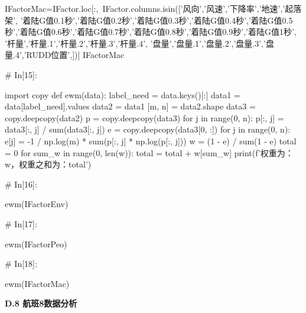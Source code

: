 \documentclass{MathorCupModeling}
\begin{document}
\begin{python}
IFactorMac=IFactor.loc[:,~IFactor.columns.isin(['风向','风速','下降率','地速','起落架',
                          '着陆G值0.1秒','着陆G值0.2秒','着陆G值0.3秒','着陆G值0.4秒','着陆G值0.5秒','着陆G值0.6秒','着陆G值0.7秒','着陆G值0.8秒','着陆G值0.9秒','着陆G值1秒',
                          '杆量','杆量.1','杆量.2','杆量.3','杆量.4',
                          '盘量','盘量.1','盘量.2','盘量.3','盘量.4','RUDD位置',])]
IFactorMac


# In[15]:


import copy
def ewm(data):
    label_need = data.keys()[:]
    data1 = data[label_need].values
    data2 = data1
    [m, n] = data2.shape
    data3 = copy.deepcopy(data2)
    p = copy.deepcopy(data3)
    for j in range(0, n):
        p[:, j] = data3[:, j] / sum(data3[:, j])
    e = copy.deepcopy(data3[0, :])
    for j in range(0, n):
        e[j] = -1 / np.log(m) * sum(p[:, j] * np.log(p[:, j]))
    w = (1 - e) / sum(1 - e)
    total = 0
    for sum_w in range(0, len(w)):
        total = total + w[sum_w]
    print(f'权重为：{w}，权重之和为：{total}')


# In[16]:


ewm(IFactorEnv)


# In[17]:


ewm(IFactorPeo)


# In[18]:


ewm(IFactorMac)


\end{python}
\newpage
\textbf{D.8 航班8数据分析}
\end{document}
